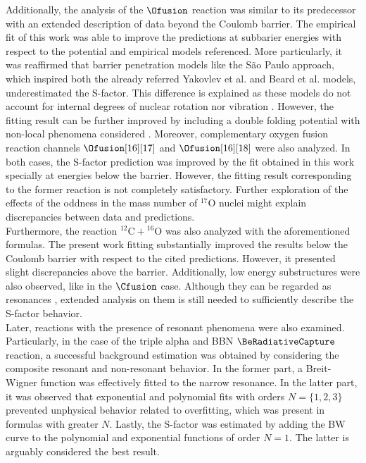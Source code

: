 \documentclass[openany]{book}
\begin{document}
Additionally, the analysis of the $\Ofusion$ reaction was similar to its predecessor with an extended description of data beyond the Coulomb barrier. The empirical fit of this work was able to improve the predictions at subbarier energies with respect to the potential and empirical models referenced. More particularly, it was reaffirmed that barrier penetration models like the São Paulo approach, which inspired both the already referred Yakovlev et al. \cite{yakovlev_beard_gasques_wiescher_2010} and Beard et al. \cite{beard_afanasjev_chamon_gasques_wiescher_yakovlev_2010} models, underestimated the S-factor. This difference is explained as these models do not account for internal degrees of nuclear rotation nor vibration \cite{duarte_gasques_oliveira_zagatto_chamon_medina_added_seale_alcantara-nunez_rossi_et_2015}. However, the fitting result can be further improved by including a double folding potential with non-local phenomena considered \cite{rojas-gamboa_velasquez_kelkar_upadhyay_2022}. Moreover, complementary oxygen fusion reaction channels $\Ofusion[16][17]$ and $\Ofusion[16][18]$ were also analyzed. In both cases, the S-factor prediction was improved by the fit obtained in this work specially at energies below the barrier. However, the fitting result corresponding to the former reaction is not completely satisfactory. Further exploration of the effects of the oddness in the mass number of $\mathrm{{}^{17}O}$ nuclei might explain discrepancies between data and predictions. \\

Furthermore, the reaction $\mathrm{{}^{12}C + {}^{16}O}$ was also analyzed with the aforementioned formulas. The present work fitting substantially improved the results below the Coulomb barrier with respect to the cited predictions. However, it presented slight discrepancies above the barrier. Additionally, low energy substructures were also observed, like in the $\Cfusion$ case. Although they can be regarded as resonances \cite{torilov_maltsev_zherebchevsky_2021}, extended analysis on them is still needed to sufficiently describe the S-factor behavior. \\

Later, reactions with the presence of resonant phenomena were also examined. Particularly, in the case of the triple alpha and BBN $\BeRadiativeCapture$ reaction, a successful background estimation was obtained by considering the composite resonant and non-resonant behavior. In the former part, a Breit-Wigner function was effectively fitted to the narrow resonance. In the latter part, it was observed that exponential and polynomial fits with orders $N = \{1, 2, 3\}$ prevented unphysical behavior related to overfitting, which was present in formulas with greater $N$. Lastly, the S-factor was estimated by adding the BW curve to the polynomial and exponential functions of order $N = 1$. The latter is arguably considered the best result. \\
\end{document}
